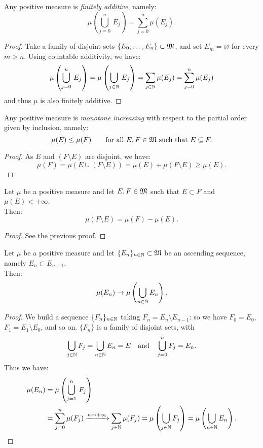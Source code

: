 \begin{prop}
	Any positive measure is \emph{finitely additive}, namely:
	$$
		\mu\left( \bigcup_{j = 0}^n \, E_j \right) 
		= \sum_{j = 0}^n \mu(E_j)
	.
	$$
\end{prop}
\begin{proof}
	Take a family of disjoint sets $\{E_0, \ldots, E_n\} \subset \mathfrak M$, and set $E_m = \varnothing$ for every $m > n$. Using countable additivity, we have:
	$$\mu \left( \bigcup_{j = 0}^n \, E_j \right)
	= \mu \left( \bigcup_{j \in \mathbb N} \, E_j \right)
	= \sum_{j \in \mathbb N} \mu(E_j)
	= \sum_{j = 0}^n \mu(E_j)$$
	and thus $\mu$ is also finitely additive.
\end{proof}

\begin{prop}
	Any positive measure is \emph{monotone increasing} with respect to the partial order given by inclusion, namely:
	$$
		\mu(E) 
		\le \mu(F) 
		\qquad \text{for all } E, F \in \mathfrak M 
		\text{ such that } E \subseteq F
	.
	$$
\end{prop}
\begin{proof}
	As $E$ and $(F \setminus E)$ are disjoint, we have:
	$$\mu(F) = \mu(E \cup (F \setminus E)) = \mu(E) + \mu(F \setminus E) \ge \mu(E).$$
\end{proof}

\begin{prop}
	Let $\mu$ be a positive measure and let $E, F \in \mathfrak M$ such that $E \subset F$ and $\mu(E) < +\infty$.\\
	Then: 
	$$
		\mu(F \setminus E) 
		= \mu(F) - \mu(E)
	.
	$$
\end{prop}
\begin{proof}
	See the previous proof.
\end{proof}

\begin{prop}
	Let $\mu$ be a positive measure and let $\{ E_n \}_{n \in \mathbb N} \subset \mathfrak M$ be an ascending sequence, namely $E_n \subset E_{n+1}$.\\
	Then:
	$$
		\mu(E_n) \to \mu\left( \bigcup_{n \in \mathbb N} E_n \right).
	$$
\end{prop}
\begin{proof}
	We build a sequence $\{F_n\}_{n \in \mathbb N}$ taking $F_n = E_n \setminus E_{n-1}$: so we have $F_0 = E_0$, $F_1 = E_1 \setminus E_0$, and so on.
	$\{F_n\}$ is a family of disjoint sets, with $$\bigcup_{j \in \mathbb N} F_j = \bigcup_{n \in \mathbb N} E_n = E \quad \text{and} \quad \bigcup_{j=0}^n F_j = E_n.$$ 
	Thus we have:
	\begin{align*}
		\mu(E_n) &= \mu \left( \bigcup_{j = 1}^n \, F_j \right)\\
		&= \sum_{j=0}^n \mu(F_j) \xrightarrow{n \to +\infty}
		\sum_{j \in \mathbb N} \mu(F_j) = \mu\left(\bigcup_{j \in \mathbb N} F_j\right) = \mu\left(\bigcup_{n \in \mathbb N} E_n \right).
	\end{align*}
\end{proof}

